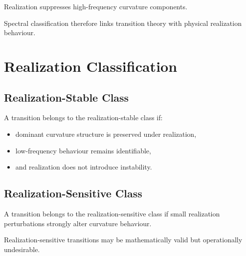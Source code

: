 \begin{proposition}
\label{prop:classification-spectral-realization}
Realization suppresses high-frequency curvature components.
\end{proposition}

Spectral classification therefore links transition theory with physical
realization behaviour.

\section{Realization Classification}

\subsection{Realization-Stable Class}

\begin{definition}
\label{def:realization-stable-class}
A transition belongs to the realization-stable class if:
\begin{itemize}
\item dominant curvature structure is preserved under realization,
\item low-frequency behaviour remains identifiable,
\item and realization does not introduce instability.
\end{itemize}
\end{definition}


\subsection{Realization-Sensitive Class}

\begin{definition}
\label{def:realization-sensitive-class}
A transition belongs to the realization-sensitive class if small
realization perturbations strongly alter curvature behaviour.
\end{definition}

Realization-sensitive transitions may be mathematically valid but
operationally undesirable.

